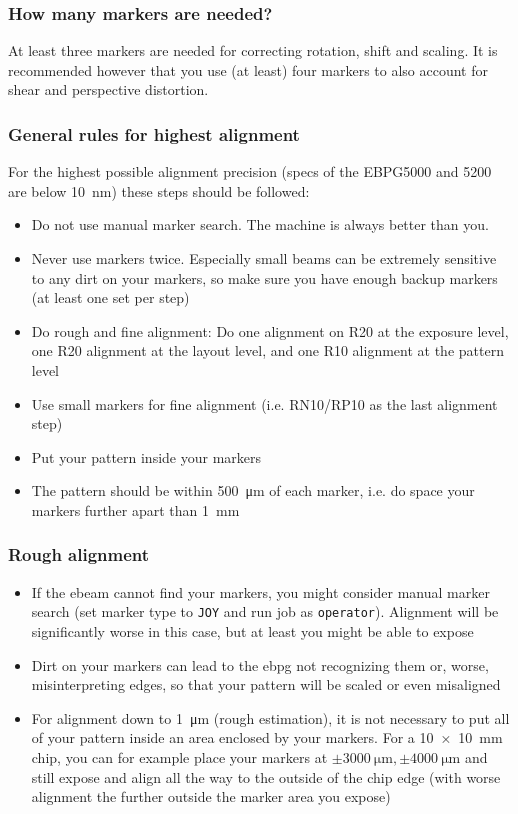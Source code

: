 \subsubsection{How many markers are needed?}
At least three markers are needed for correcting rotation, shift and scaling. It is recommended however that you use (at least) four markers to also account for shear and perspective distortion.

\subsubsection{General rules for highest alignment}
For the highest possible alignment precision (specs of the EBPG5000 and 5200 are below \SI{10}{\nano\meter}) these steps should be followed:
\begin{itemize}
	\item Do not use manual marker search. The machine is always better than you.
	\item Never use markers twice. Especially small beams can be extremely sensitive to any dirt on your markers, so make sure you have enough backup markers (at least one set per step)
	\item Do rough and fine alignment: Do one alignment on R20 at the exposure level, one R20 alignment at the layout level, and one R10 alignment at the pattern level
	\item Use small markers for fine alignment (i.e. RN10/RP10 as the last alignment step)
	\item Put your pattern inside your markers
	\item The pattern should be within \SI{500}{\micro\meter} of each marker, i.e. do space your markers further apart than \SI{1}{\milli\meter}
\end{itemize}

\subsubsection{Rough alignment}
\begin{itemize}
	\item If the ebeam cannot find your markers, you might consider manual marker search (set marker type to \lstinline|JOY| and run job as \lstinline|operator|). Alignment will be significantly worse in this case, but at least you might be able to expose
	\item Dirt on your markers can lead to the ebpg not recognizing them or, worse, misinterpreting edges, so that your pattern will be scaled or even misaligned
	\item For alignment down to \SI{1}{\micro\meter} (rough estimation), it is not necessary to put all of your pattern inside an area enclosed by your markers. For a \SI{10x10}{\milli\meter} chip, you can for example place your markers at $\pm\SI{3000}{\micro\meter},\pm\SI{4000}{\micro\meter}$ and still expose and align all the way to the outside of the chip edge (with worse alignment the further outside the marker area you expose)
\end{itemize}

